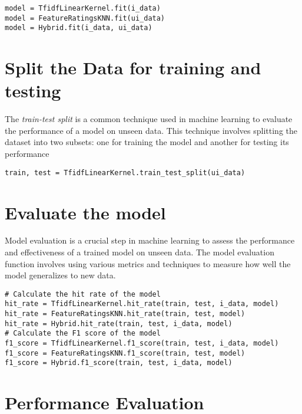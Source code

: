 \begin{verbatim}
model = TfidfLinearKernel.fit(i_data)
model = FeatureRatingsKNN.fit(ui_data)
model = Hybrid.fit(i_data, ui_data)
\end{verbatim}

\newpage
\section{Split the Data for training and testing}

The \textit{train-test split} is a common technique used in machine learning to evaluate the 
performance of a model on unseen data. This technique involves splitting the dataset 
into two subsets: one for training the model and another for testing its performance

\begin{verbatim}
train, test = TfidfLinearKernel.train_test_split(ui_data)
\end{verbatim}

\section{Evaluate the model}

Model evaluation is a crucial step in machine learning to assess the performance and 
effectiveness of a trained model on unseen data. The model evaluation function involves 
using various metrics and techniques to measure how well the model generalizes to new data.

\begin{verbatim}
# Calculate the hit rate of the model
hit_rate = TfidfLinearKernel.hit_rate(train, test, i_data, model)
hit_rate = FeatureRatingsKNN.hit_rate(train, test, model)
hit_rate = Hybrid.hit_rate(train, test, i_data, model)
# Calculate the F1 score of the model
f1_score = TfidfLinearKernel.f1_score(train, test, i_data, model)
f1_score = FeatureRatingsKNN.f1_score(train, test, model)
f1_score = Hybrid.f1_score(train, test, i_data, model)
\end{verbatim}

\section{Performance Evaluation}

